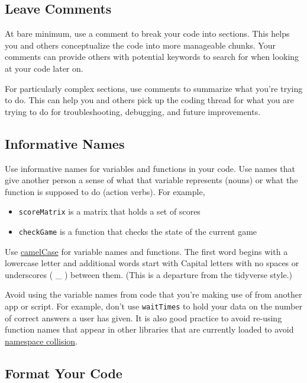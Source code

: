 \documentclass[
]{book}
\providecommand{\tightlist}{%
  \setlength{\itemsep}{0pt}\setlength{\parskip}{0pt}}
\begin{document}
\hypertarget{comments}{%
\subsection{Leave Comments}\label{comments}}

At bare minimum, use a comment to break your code into sections. This helps you and others conceptualize the code into more manageable chunks. Your comments can provide others with potential keywords to search for when looking at your code later on.

For particularly complex sections, use comments to summarize what you're trying to do. This can help you and others pick up the coding thread for what you are trying to do for troubleshooting, debugging, and future improvements.

\hypertarget{naming}{%
\subsection{Informative Names}\label{naming}}

Use informative names for variables and functions in your code. Use names that give another person a sense of what that variable represents (nouns) or what the function is supposed to do (action verbs). For example,

\begin{itemize}
\tightlist
\item
  \texttt{scoreMatrix} is a matrix that holds a set of scores\\
\item
  \texttt{checkGame} is a function that checks the state of the current game
\end{itemize}

Use \href{https://en.wikipedia.org/wiki/Camel_case}{camelCase} for variable names and functions. The first word begins with a lowercase letter and additional words start with Capital letters with no spaces or underscores ( \_ ) between them. (This is a departure from the tidyverse style.)

Avoid using the variable names from code that you're making use of from another app or script. For example, don't use \texttt{waitTimes} to hold your data on the number of correct answers a user has given. It is also good practice to avoid re-using function names that appear in other libraries that are currently loaded to avoid \href{https://en.wikipedia.org/wiki/Naming_collision}{namespace collision}.

\hypertarget{formatCode}{%
\subsection{Format Your Code}\label{formatCode}}
\end{document}

